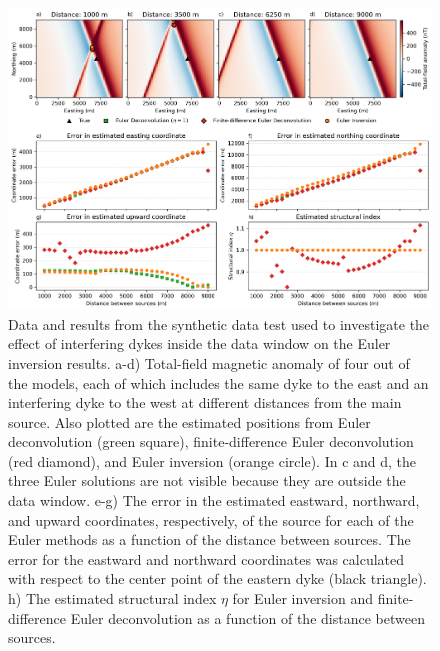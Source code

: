 \begin{figure}[tb!]
\centering
\includegraphics[width=1\linewidth]{euler-inversion/figures/synthetic-interfering-sources-dykes.png}
\caption{
    Data and results from the synthetic data test used to investigate the
    effect of interfering dykes inside the data window on the Euler inversion
    results.
    a-d) Total-field magnetic anomaly of four out of the \SynInterfDykesNModels{}
    models, each of which includes the same dyke to the east and an interfering
    dyke to the west at different distances from the main source. Also plotted
    are the estimated positions from Euler deconvolution (green square),
    finite-difference Euler deconvolution (red diamond), and Euler inversion
    (orange circle).
    In c and d, the three Euler solutions are not visible because they are
    outside the data window.
    e-g) The error in the estimated eastward, northward, and upward
    coordinates, respectively, of the source for each of the Euler methods as
    a function of the distance between sources. The error for the eastward and
    northward coordinates was calculated with respect to the center point of
    the eastern dyke (black triangle).
    h) The estimated structural index $\eta$ for Euler inversion and
    finite-difference Euler deconvolution as a function of the distance between
    sources.
}
\label{fig:interf-dykes}
\end{figure}

